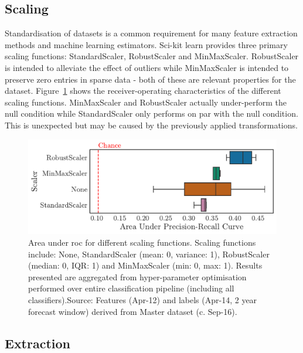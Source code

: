 \documentclass[../thesis/thesis.tex]{subfiles}
\begin{document}
\subsection{Scaling}

Standardisation of datasets is a common requirement for many feature extraction methods and machine learning estimators. Sci-kit learn provides three primary scaling functions: StandardScaler, RobustScaler and MinMaxScaler. RobustScaler is intended to alleviate the effect of outliers while MinMaxScaler is intended to preserve zero entries in sparse data - both of these are relevant properties for the dataset. Figure~\ref{fig:design:scaler} shows the receiver-operating characteristics of the different scaling functions. MinMaxScaler and RobustScaler actually under-perform the null condition while StandardScaler only performs on par with the null condition. This is unexpected but may be caused by the previously applied transformations.

\begin{figure}[!htb]
    \centering
    \includegraphics[width=\textwidth]{../figures/design/auc_scaler}
    \caption[Area under PR Curves by scaling function]{Area under \gls{roc} for different scaling functions. Scaling functions include: None, StandardScaler (mean: 0, variance: 1), RobustScaler (median: 0, IQR: 1) and MinMaxScaler (min: 0, max: 1). Results presented are aggregated from hyper-parameter optimisation performed over entire classification pipeline (including all classifiers).Source: Features (Apr-12) and labels (Apr-14, 2 year forecast window) derived from Master dataset (c. Sep-16).}
    \label{fig:design:scaler}
\end{figure}

\subsection{Extraction}
\end{document}
